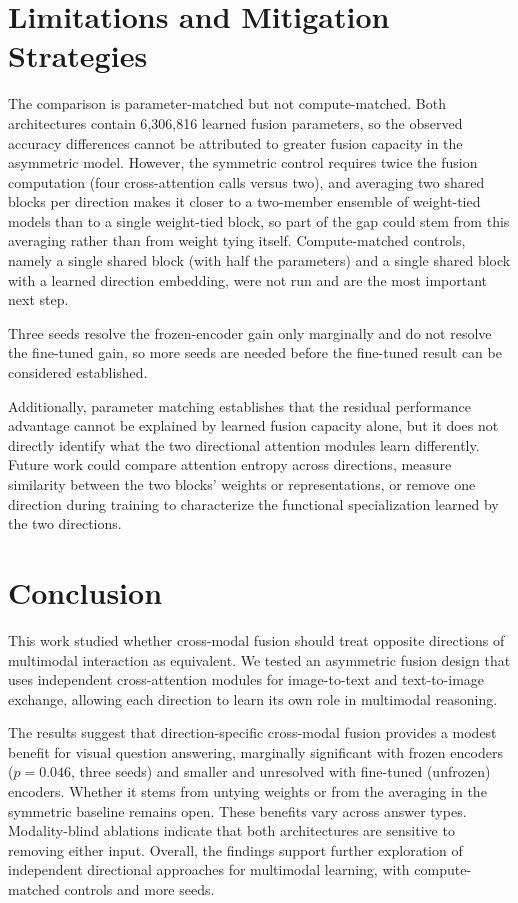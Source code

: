 \documentclass[conference]{IEEEtran}
\begin{document}
\section{Limitations and Mitigation Strategies}
\label{sec:limits}

The comparison is parameter-matched but not compute-matched. Both architectures contain 6{,}306{,}816 learned fusion parameters, so the observed accuracy differences cannot be attributed to greater fusion capacity in the asymmetric model. However, the symmetric control requires twice the fusion computation (four cross-attention calls versus two), and averaging two shared blocks per direction makes it closer to a two-member ensemble of weight-tied models than to a single weight-tied block, so part of the gap could stem from this averaging rather than from weight tying itself. Compute-matched controls, namely a single shared block (with half the parameters) and a single shared block with a learned direction embedding, were not run and are the most important next step.

Three seeds resolve the frozen-encoder gain only marginally and do not resolve the fine-tuned gain, so more seeds are needed before the fine-tuned result can be considered established.


Additionally, parameter matching establishes that the residual performance advantage cannot be explained by learned fusion capacity alone, but it does not directly identify what the two directional attention modules learn differently. Future work could compare attention entropy across directions, measure similarity between the two blocks' weights or representations, or remove one direction during training to characterize the functional specialization learned by the two directions.

\section{Conclusion}

This work studied whether cross-modal fusion should treat opposite directions of multimodal interaction as equivalent. We tested an asymmetric fusion design that uses independent cross-attention modules for image-to-text and text-to-image exchange, allowing each direction to learn its own role in multimodal reasoning.


The results suggest that direction-specific cross-modal fusion provides a modest benefit for visual question answering, marginally significant with frozen encoders ($p=0.046$, three seeds) and smaller and unresolved with fine-tuned (unfrozen) encoders. Whether it stems from untying weights or from the averaging in the symmetric baseline remains open. These benefits vary across answer types. Modality-blind ablations indicate that both architectures are sensitive to removing either input. Overall, the findings support further exploration of independent directional approaches for multimodal learning, with compute-matched controls and more seeds.



\end{document}
